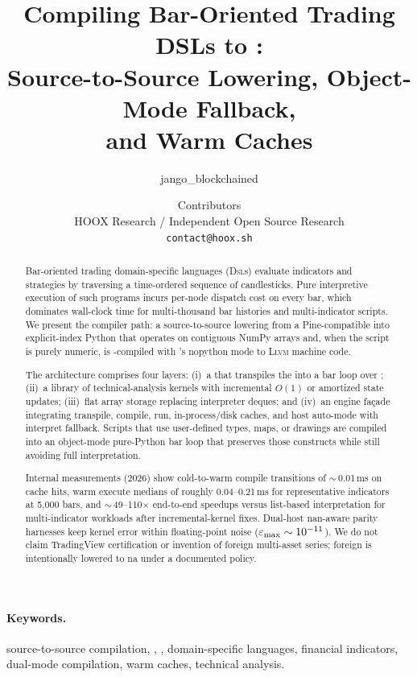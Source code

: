 \documentclass[11pt,a4paper]{article}
\title{%
  Compiling Bar-Oriented Trading DSLs to \numba{}:\\
  Source-to-Source Lowering, Object-Mode Fallback,\\
  and Warm \ir{} Caches%
}
\author{%
  jango\_blockchained \and \pyne{} Contributors\\
  \small HOOX Research / Independent Open Source Research\\
  \small \texttt{contact@hoox.sh}%
}
\date{}
\newcommand{\llvm}{\textsc{Llvm}}
\renewcommand{\na}{\textsf{na}}
\begin{document}
\maketitle

\begin{abstract}
Bar-oriented trading domain-specific languages (\textsc{Dsl}s) evaluate
indicators and strategies by traversing a time-ordered sequence of
candlesticks. Pure interpretive execution of such programs incurs per-node
dispatch cost on every bar, which dominates wall-clock time for multi-thousand
bar histories and multi-indicator scripts. We present the \pyne{} \numba{}
compiler path: a source-to-source lowering from a Pine-compatible \ast{} into
explicit-index Python that operates on contiguous NumPy arrays and, when the
script is purely numeric, is \jit{}-compiled with \numba{}'s nopython mode to
\llvm{} machine code.

The architecture comprises four layers: (i)~a  that
transpiles the \ast{} into a bar loop over ;
(ii)~a library of  technical-analysis kernels with incremental
$O(1)$ or amortized state updates; (iii)~flat array storage replacing
interpreter deques; and (iv)~an engine fa\c{c}ade integrating transpile,
compile, run, in-process/disk \ir{} caches, and host auto-mode with interpret
fallback. Scripts that use user-defined types, maps, or drawings are compiled
into an object-mode pure-Python bar loop that preserves those constructs while
still avoiding full \ast{} interpretation.

Internal measurements (2026) show cold-to-warm compile transitions of
$\sim$\,0.01\,ms on cache hits, warm execute medians of roughly
0.04--0.21\,ms for representative indicators at 5{,}000 bars, and
$\sim$\,49--110$\times$ end-to-end speedups versus list-based interpretation
for multi-indicator workloads after incremental-kernel fixes. Dual-host
nan-aware parity harnesses keep kernel error within floating-point noise
($\varepsilon_{\mathrm{max}} \sim 10^{-11}$). We do not claim TradingView certification or
invention of foreign multi-asset series; foreign  is
intentionally lowered to \na{} under a documented policy.
\end{abstract}

\paragraph{Keywords.}
source-to-source compilation, \numba{}, \jit{}, domain-specific languages,
financial indicators, dual-mode compilation, warm \ir{} caches, technical
analysis.
\end{document}
